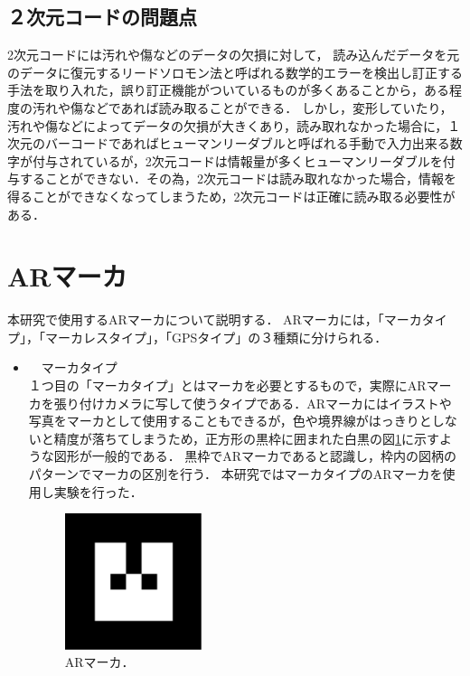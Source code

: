 \subsection{２次元コードの問題点}
2次元コードには汚れや傷などのデータの欠損に対して，
読み込んだデータを元のデータに復元するリードソロモン法と呼ばれる数学的エラーを検出し訂正する手法を取り入れた，誤り訂正機能がついているものが多くあることから，ある程度の汚れや傷などであれば読み取ることができる．
しかし，変形していたり，汚れや傷などによってデータの欠損が大きくあり，読み取れなかった場合に，１次元のバーコードであればヒューマンリーダブルと呼ばれる手動で入力出来る数字が付与されているが，2次元コードは情報量が多くヒューマンリーダブルを付与することができない．その為，2次元コードは読み取れなかった場合，情報を得ることができなくなってしまうため，2次元コードは正確に読み取る必要性がある．









\section{ARマーカ}
本研究で使用するARマーカについて説明する．
ARマーカには，「マーカタイプ」，「マーカレスタイプ」，「GPSタイプ」の３種類に分けられる．

\newpage


\begin{itemize}
\item　マーカタイプ \\

１つ目の「マーカタイプ」とはマーカを必要とするもので，実際にARマーカを張り付けカメラに写して使うタイプである．ARマーカにはイラストや写真をマーカとして使用することもできるが，色や境界線がはっきりとしないと精度が落ちてしまうため，正方形の黒枠に囲まれた白黒の図\ref{マーカ}に示すような図形が一般的である．
黒枠でARマーカであると認識し，枠内の図柄のパターンでマーカの区別を行う．
本研究ではマーカタイプのARマーカを使用し実験を行った．
      \begin{figure}[htpp]
      \begin{center}
      \includegraphics[width=40mm]{figure/eps/ARマーカ.eps}
      \caption{ARマーカ．}
      \label{マーカ}
      \end{center}
      \end{figure}


\end{itemize}



